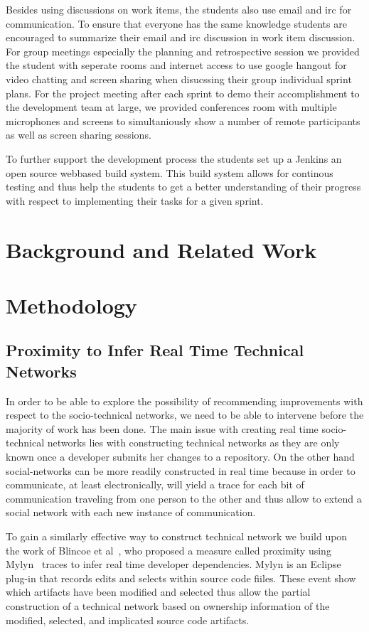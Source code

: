 Besides using discussions on work items, the students also use email and irc for communication.
To ensure that everyone has the same knowledge students are encouraged to summarize their email and irc discussion in work item discussion.
For group meetings especially the planning and retrospective session we provided the student with seperate rooms and internet access to use google hangout for video chatting and screen sharing when disucssing their group individual sprint plans.
For the project meeting after each sprint to demo their accomplishment to the development team at large, we provided conferences room with multiple microphones and screens to simultaniously show a number of remote participants as well as screen sharing sessions. 

To further support the development process the students set up a Jenkins an open source webbased build system.
This build system allows for continous testing and thus help the students to get a better understanding of their progress with respect to implementing their tasks for a given sprint.

\section{Background and Related Work}

\section{Methodology}
\subsection{Proximity to Infer Real Time Technical Networks}
In order to be able to explore the possibility of recommending improvements with respect to the socio-technical networks, we need to be able to intervene before the majority of work has been done.
The main issue with creating real time socio-technical networks lies with constructing technical networks as they are only known once a developer submits her changes to a repository.
On the other hand social-networks can be more readily constructed in real time because in order to communicate, at least electronically, will yield a trace for each bit of communication traveling from one person to the other and thus allow to extend a social network with each new instance of communication.

To gain a similarly effective way to construct technical network we build upon the work of Blincoe et al~\cite{}, who proposed a measure called proximity using Mylyn~\cite{} traces to infer real time developer dependencies.
Mylyn is an Eclipse plug-in that records edits and selects within source code fiiles.
These event show which artifacts have been modified and selected thus allow the partial construction of a technical network based on ownership information of the modified, selected, and implicated source code artifacts.

